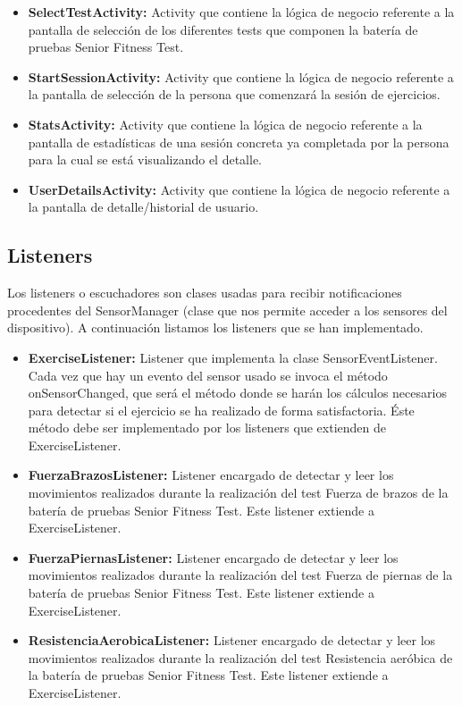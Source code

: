 \begin{itemize}
\item \textbf{SelectTestActivity:} Activity que contiene la lógica de negocio referente a la pantalla de selección de los diferentes tests que componen la batería de pruebas Senior Fitness Test.
\item \textbf{StartSessionActivity:} Activity que contiene la lógica de negocio referente a la pantalla de selección de la persona que comenzará la sesión de ejercicios.
\item \textbf{StatsActivity:} Activity que contiene la lógica de negocio referente a la pantalla de estadísticas de una sesión concreta ya completada por la persona para la cual se está visualizando el detalle.
\item \textbf{UserDetailsActivity:} Activity que contiene la lógica de negocio referente a la pantalla de detalle/historial de usuario.
\end{itemize}

\subsection{Listeners}

Los listeners o escuchadores son clases usadas para recibir notificaciones procedentes del SensorManager (clase que nos permite acceder a los sensores del dispositivo). A continuación listamos los listeners que se han implementado.

\begin{itemize}
\item \textbf{ExerciseListener:} Listener que implementa la clase SensorEventListener. Cada vez que hay un evento del sensor usado se invoca el método onSensorChanged, que será el método donde se harán los cálculos necesarios para detectar si el ejercicio se ha realizado de forma satisfactoria. Éste método debe ser implementado por los listeners que extienden de ExerciseListener.
\item \textbf{FuerzaBrazosListener:} Listener encargado de detectar y leer los movimientos realizados durante la realización del test Fuerza de brazos de la batería de pruebas Senior Fitness Test. Este listener extiende a ExerciseListener.
\item \textbf{FuerzaPiernasListener:} Listener encargado de detectar y leer los movimientos realizados durante la realización del test Fuerza de piernas de la batería de pruebas Senior Fitness Test. Este listener extiende a ExerciseListener.
\item \textbf{ResistenciaAerobicaListener:} Listener encargado de detectar y leer los movimientos realizados durante la realización del test Resistencia aeróbica de la batería de pruebas Senior Fitness Test. Este listener extiende a ExerciseListener.
\end{itemize}

